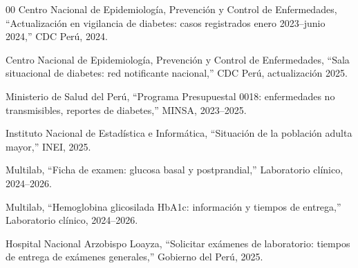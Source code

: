 \documentclass[conference]{IEEEtran}
\begin{document}
\begin{thebibliography}{00}
Centro Nacional de Epidemiología, Prevención y Control de Enfermedades, ``Actualización en vigilancia de diabetes: casos registrados enero 2023--junio 2024,'' CDC Perú, 2024.

Centro Nacional de Epidemiología, Prevención y Control de Enfermedades, ``Sala situacional de diabetes: red notificante nacional,'' CDC Perú, actualización 2025.

Ministerio de Salud del Perú, ``Programa Presupuestal 0018: enfermedades no transmisibles, reportes de diabetes,'' MINSA, 2023--2025.

Instituto Nacional de Estadística e Informática, ``Situación de la población adulta mayor,'' INEI, 2025.

Multilab, ``Ficha de examen: glucosa basal y postprandial,'' Laboratorio clínico, 2024--2026.

Multilab, ``Hemoglobina glicosilada HbA1c: información y tiempos de entrega,'' Laboratorio clínico, 2024--2026.

Hospital Nacional Arzobispo Loayza, ``Solicitar exámenes de laboratorio: tiempos de entrega de exámenes generales,'' Gobierno del Perú, 2025.

\end{thebibliography}
\end{document}
